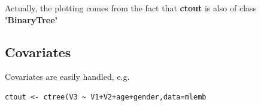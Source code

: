 Actually, the plotting comes from the fact that \textbf{ctout} is also
of class \textbf{'BinaryTree'}

\subsection{Covariates}

Covariates are easily handled, e.g.

\begin{lstlisting}
ctout <- ctree(V3 ~ V1+V2+age+gender,data=mlemb
\end{lstlisting} 

